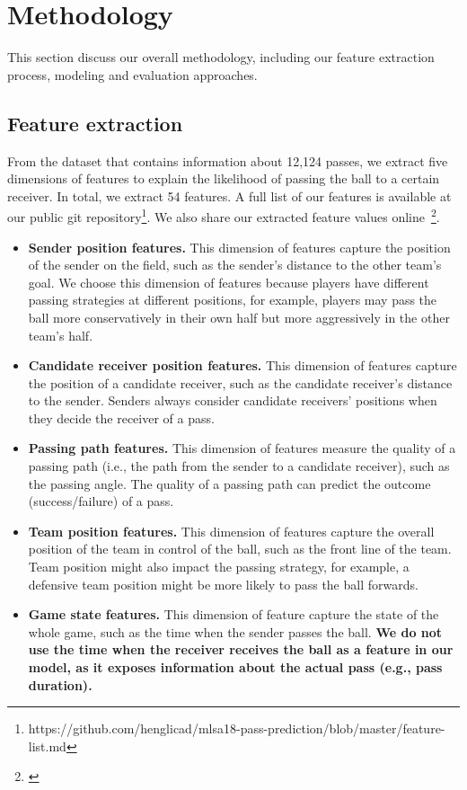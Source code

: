 \section{Methodology} \label{methodology}
This section discuss our overall methodology, including our feature extraction process, modeling and evaluation approaches.

\subsection{Feature extraction}

From the dataset that contains information about 12,124 passes\footnotemark[\ref{origin_dataset}], we extract five dimensions of features to explain the likelihood of passing the ball to a certain receiver. In total, we extract 54 features. A full list of our features is available at our public git repository\footnote{\label{feature-list}https://github.com/henglicad/mlsa18-pass-prediction/blob/master/feature-list.md}. 
We also share our extracted feature values online~\footnote{\label{feature-values}}.
\begin{itemize}
	\item \textbf{Sender position features.} This dimension of features capture the position of the sender on the field, such as the sender's distance to the other team's goal. We choose this dimension of features because players have different passing strategies at different positions, for example, players may pass the ball more conservatively in their own half but more aggressively in the other team's half.
	\item \textbf{Candidate receiver position features.} This dimension of features capture the position of a candidate receiver, such as the candidate receiver's distance to the sender. Senders always consider candidate receivers' positions when they decide the receiver of a pass.
	\item \textbf{Passing path features.} This dimension of features measure the quality of a passing path (i.e., the path from the sender to a candidate receiver), such as the passing angle. The quality of a passing path can predict the outcome (success/failure) of a pass.
	\item \textbf{Team position features.} This dimension of features capture the overall position of the team in control of the ball, such as the front line of the team. Team position might also impact the passing strategy, for example, a defensive team position might be more likely to pass the ball forwards.
	\item \textbf{Game state features.} This dimension of feature capture the state of the whole game, such as the time when the sender passes the ball. \textbf{We do not use the time when the receiver receives the ball as a feature in our model, as it exposes information about the actual pass (e.g., pass duration).}
\end{itemize}

